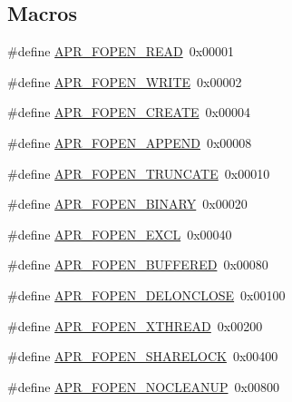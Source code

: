 \subsection*{Macros}
\begin{DoxyCompactItemize}
\item 
\#define \hyperlink{group__apr__file__open__flags_gaf9e7303f028b130ff7d4b209d6662d7d}{A\+P\+R\+\_\+\+F\+O\+P\+E\+N\+\_\+\+R\+E\+AD}~0x00001
\item 
\#define \hyperlink{group__apr__file__open__flags_gac598bb95fc9476b0bf2ed0b1c308842c}{A\+P\+R\+\_\+\+F\+O\+P\+E\+N\+\_\+\+W\+R\+I\+TE}~0x00002
\item 
\#define \hyperlink{group__apr__file__open__flags_gafe94f21ccbf411172e70e7f473af251a}{A\+P\+R\+\_\+\+F\+O\+P\+E\+N\+\_\+\+C\+R\+E\+A\+TE}~0x00004
\item 
\#define \hyperlink{group__apr__file__open__flags_ga45f353db9b71d4760a3f35cf3781cfc8}{A\+P\+R\+\_\+\+F\+O\+P\+E\+N\+\_\+\+A\+P\+P\+E\+ND}~0x00008
\item 
\#define \hyperlink{group__apr__file__open__flags_ga09b05a5bd5db534b93794f7657bcb146}{A\+P\+R\+\_\+\+F\+O\+P\+E\+N\+\_\+\+T\+R\+U\+N\+C\+A\+TE}~0x00010
\item 
\#define \hyperlink{group__apr__file__open__flags_gacb20b3028864f34cb26314fe2cacc3fa}{A\+P\+R\+\_\+\+F\+O\+P\+E\+N\+\_\+\+B\+I\+N\+A\+RY}~0x00020
\item 
\#define \hyperlink{group__apr__file__open__flags_gabb7fb062cdf1d58faee8c7ea518496f1}{A\+P\+R\+\_\+\+F\+O\+P\+E\+N\+\_\+\+E\+X\+CL}~0x00040
\item 
\#define \hyperlink{group__apr__file__open__flags_gac48fd4c853c9f561632a2e8aaf5d8d97}{A\+P\+R\+\_\+\+F\+O\+P\+E\+N\+\_\+\+B\+U\+F\+F\+E\+R\+ED}~0x00080
\item 
\#define \hyperlink{group__apr__file__open__flags_ga5d3756f6d242c667ed1d3f54af4916eb}{A\+P\+R\+\_\+\+F\+O\+P\+E\+N\+\_\+\+D\+E\+L\+O\+N\+C\+L\+O\+SE}~0x00100
\item 
\#define \hyperlink{group__apr__file__open__flags_ga435cd9b2604b11796779c23ffa00a3dd}{A\+P\+R\+\_\+\+F\+O\+P\+E\+N\+\_\+\+X\+T\+H\+R\+E\+AD}~0x00200
\item 
\#define \hyperlink{group__apr__file__open__flags_ga426f6e2a8457ab410d99248269059a18}{A\+P\+R\+\_\+\+F\+O\+P\+E\+N\+\_\+\+S\+H\+A\+R\+E\+L\+O\+CK}~0x00400
\item 
\#define \hyperlink{group__apr__file__open__flags_ga3fc9b5a7791d9f462997cd29de67eb80}{A\+P\+R\+\_\+\+F\+O\+P\+E\+N\+\_\+\+N\+O\+C\+L\+E\+A\+N\+UP}~0x00800
\item 

\end{DoxyCompactItemize}
